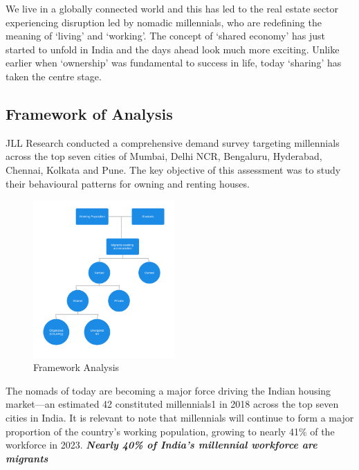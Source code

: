 We live in a globally connected world and this has led to the real estate sector
experiencing disruption led by nomadic millennials, who are redefining the meaning
of ‘living’ and ‘working’. The concept of ‘shared economy’ has just started to
unfold in India and the days ahead look much more exciting. Unlike earlier when ‘ownership’
was fundamental to success in life, today ‘sharing’ has taken the centre stage.\par

\subsection{Framework of Analysis}
JLL Research conducted a comprehensive demand survey targeting millennials across
the top seven cities of Mumbai, Delhi NCR, Bengaluru, Hyderabad, Chennai, Kolkata
and Pune. The key objective of this assessment was to study their behavioural patterns
for owning and renting houses.\par\medskip
\begin{figure}
      \centering
      \includegraphics[width=0.48\textwidth]{Images/framework.png}
      \caption{Framework Analysis}
\end{figure}
The nomads of today are becoming a major force driving the Indian housing market—an estimated 42%
constituted millennials1 in 2018 across the top seven cities in India. It is relevant to note that millennials will continue to form a major
proportion of the country’s working population, growing to nearly 41\% of the workforce in 2023.
\textbf{\textit{Nearly 40\% of India’s millennial workforce are migrants}}\par

